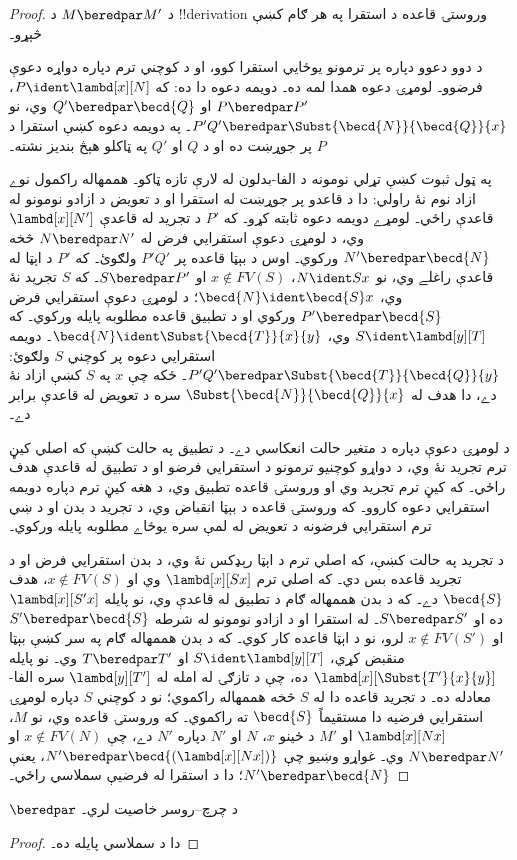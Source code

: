 \documentclass[../../../include/open-logic-section]{subfiles}
\begin{document}
\begin{proof}
  د $M \beredpar M'$ د !!{derivation} وروستۍ قاعده د استقرا په هر ګام کښې څېړو۔

  د دوو دعوو دپاره پر ترمونو يوځايي استقرا کوو، او د کوچني ترم دپاره دواړه دعوې فرضوو۔ لومړۍ دعوه همدا لمه ده۔ دويمه دعوه دا ده: که $P \ident \lambd[x][N]$، $P \beredpar P'$ او $Q' \beredpar \becd{Q}$ وي، نو $P'Q' \beredpar \Subst{\becd{N}}{\becd{Q}}{x}$۔ په دويمه دعوه کښې استقرا د $P$ پر جوړښت ده او د $Q$ او $Q'$ په ټاکلو هېڅ بنديز نشته۔
\par په ټول ثبوت کښې تړلي نومونه د الفا-بدلون له لارې تازه ټاکو۔ هممهاله راکمول نوے ازاد نوم نۀ راولي: دا د قاعدو پر جوړښت له استقرا او د تعويض د ازادو نومونو له قاعدې راځي۔ لومړے دويمه دعوه ثابته کړو۔ که $P'$ د تجريد له قاعدې $\lambd[x][N']$ وي، د لومړۍ دعوې استقرايي فرض له $N \beredpar N'$ څخه $N' \beredpar \becd{N}$ ورکوي۔ اوس د بېټا قاعده پر $P'Q'$ ولګوئ۔ که $P'$ د اېټا له قاعدې راغلے وي، نو $N \ident Sx$، $x \notin FV(S)$ او $S \beredpar P'$۔ که $S$ تجريد نۀ وي، $\becd{N} \ident \becd{S}x$؛ د لومړۍ دعوې استقرايي فرض $P' \beredpar \becd{S}$ ورکوي او د تطبيق قاعده مطلوبه پايله ورکوي۔ که $S \ident \lambd[y][T]$ وي، $\becd{N} \ident \Subst{\becd{T}}{x}{y}$۔ دويمه استقرايي دعوه پر کوچني $S$ ولګوئ: $P'Q' \beredpar \Subst{\becd{T}}{\becd{Q}}{y}$۔ ځکه چې $x$ په $S$ کښې ازاد نۀ دے، دا هدف له $\Subst{\becd{N}}{\becd{Q}}{x}$ سره د تعويض له قاعدې برابر دے۔
\par د لومړۍ دعوې دپاره د متغير حالت انعکاسي دے۔ د تطبيق په حالت کښې که اصلي کيڼ ترم تجريد نۀ وي، د دواړو کوچنيو ترمونو د استقرايي فرضو او د تطبيق له قاعدې هدف راځي۔ که کيڼ ترم تجريد وي او وروستۍ قاعده تطبيق وي، د هغه کيڼ ترم دپاره دويمه استقرايي دعوه کاروو۔ که وروستۍ قاعده د بېټا انقباض وي، د تجريد د بدن او د ښي ترم استقرايي فرضونه د تعويض له لمې سره يوځاے مطلوبه پايله ورکوي۔
\par د تجريد په حالت کښې، که اصلي ترم د اېټا رېډکس نۀ وي، د بدن استقرايي فرض او د تجريد قاعده بس دي۔ که اصلي ترم $\lambd[x][Sx]$ وي او $x \notin FV(S)$، هدف $\becd{S}$ دے۔ که د بدن هممهاله ګام د تطبيق له قاعدې وي، نو پايله $\lambd[x][S'x]$ ده او $S \beredpar S'$۔ له استقرا او د ازادو نومونو له شرطه $S' \beredpar \becd{S}$ او $x \notin FV(S')$ لرو، نو د اېټا قاعده کار کوي۔ که د بدن هممهاله ګام په سر کښې بېټا منقبض کړي، $S \ident \lambd[y][T]$ او $T \beredpar T'$ وي۔ نو پايله $\lambd[x][\Subst{T'}{x}{y}]$ ده، چې د تازګۍ له امله له $\lambd[y][T']$ سره الفا-معادله ده۔ د تجريد قاعده دا له $S$ څخه هممهاله راکموي؛ نو د کوچني $S$ دپاره لومړۍ استقرايي فرضيه دا مستقيماً $\becd{S}$ ته راکموي۔
  که وروستۍ قاعده  وي، نو $M$،
  $\lambd[x][Nx]$ او $M'$ د ځينو $x$، $N$ او $N'$ دپاره
  $N'$ دے، چې $x \notin FV(N)$ او $N \beredpar N'$ وي۔
  غواړو وښيو چې $N' \beredpar
  \becd{(\lambd[x][Nx])}$، يعنې $N' \beredpar \becd{N}$؛
  دا د استقرا له فرضيې سملاسي راځي۔
\end{proof}

\begin{thm}
  $\beredpar$ د چرچ--روسر خاصيت لري۔
\end{thm}

\begin{proof}
  دا د  سملاسي پايله ده۔
\end{proof}
\end{document}
